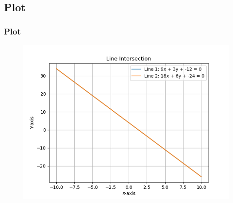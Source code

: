 \documentclass{beamer}
\theoremstyle{remark}
\numberwithin{equation}{section}
\begin{document}
\subsection{Plot}
\begin{frame}
\frametitle{Plot}


\begin{figure}[h!]
   \centering
   \includegraphics[width=0.7\linewidth]{figs/Figure_1.png}
   \label{Graph by Finite difference Method}
\end{figure}
\end{frame}
\end{document}
